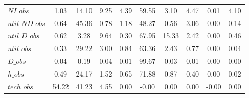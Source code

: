 \begin{center}
\begin{longtable}{lccccccccc}
$NI\_obs        $	 & 	         1.03	 & 	        14.10	 & 	         9.25	 & 	         4.39	 & 	        59.55	 & 	         3.10	 & 	         4.47	 & 	         0.01	 & 	         4.10 \\ 
$util\_ND\_obs  $	 & 	         0.64	 & 	        45.36	 & 	         0.78	 & 	         1.18	 & 	        48.27	 & 	         0.56	 & 	         3.06	 & 	         0.00	 & 	         0.14 \\ 
$util\_D\_obs   $	 & 	         0.62	 & 	         3.28	 & 	         9.64	 & 	         0.30	 & 	        67.95	 & 	        15.33	 & 	         2.42	 & 	         0.00	 & 	         0.46 \\ 
$util\_obs      $	 & 	         0.33	 & 	        29.22	 & 	         3.00	 & 	         0.84	 & 	        63.36	 & 	         2.43	 & 	         0.77	 & 	         0.00	 & 	         0.04 \\ 
$D\_obs         $	 & 	         0.04	 & 	         0.19	 & 	         0.04	 & 	         0.01	 & 	        99.67	 & 	         0.03	 & 	         0.01	 & 	         0.00	 & 	         0.00 \\ 
$h\_obs         $	 & 	         0.49	 & 	        24.17	 & 	         1.52	 & 	         0.65	 & 	        71.88	 & 	         0.87	 & 	         0.40	 & 	         0.00	 & 	         0.02 \\ 
$tech\_obs      $	 & 	        54.22	 & 	        41.23	 & 	         4.55	 & 	         0.00	 & 	        -0.00	 & 	         0.00	 & 	         0.00	 & 	        -0.00	 & 	         0.00 \\ 
\end{longtable}
 \end{center}
